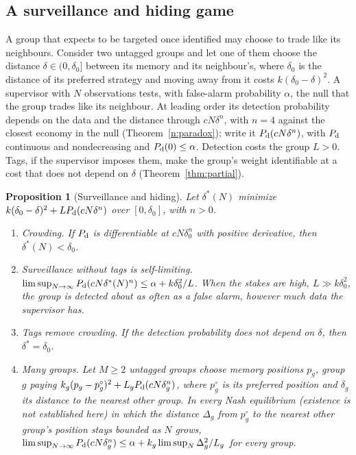 \documentclass[12pt]{article}
\newtheorem{proposition}[theorem]{Proposition}
\theoremstyle{definition}
\theoremstyle{remark}
\begin{document}
\subsection{A surveillance and hiding game}

A group that expects to be targeted once identified may choose to trade like its neighbours. Consider two untagged groups and let one of them choose the distance $\delta\in(0,\delta_0]$ between its memory and its neighbour's, where $\delta_0$ is the distance of its preferred strategy and moving away from it costs $k(\delta_0-\delta)^2$. A supervisor with $N$ observations tests, with false-alarm probability $\alpha$, the null that the group trades like its neighbour. At leading order its detection probability depends on the data and the distance through $cN\delta^n$, with $n=4$ against the closest economy in the null (Theorem~\ref{n:paradox}); write it $P_{\rm d}(cN\delta^n)$, with $P_{\rm d}$ continuous and nondecreasing and $P_{\rm d}(0)\le\alpha$. Detection costs the group $L>0$. Tags, if the supervisor imposes them, make the group's weight identifiable at a cost that does not depend on $\delta$ (Theorem~\ref{thm:partial}).

\begin{proposition}[Surveillance and hiding]\label{prop:hidegame}
Let $\delta^*(N)$ minimize $k(\delta_0-\delta)^2+LP_{\rm d}(cN\delta^n)$ over $[0,\delta_0]$, with $n>0$.
\begin{enumerate}[label=(\roman*),itemsep=1pt]
\item \emph{Crowding.} If $P_{\rm d}$ is differentiable at $cN\delta_0^n$ with positive derivative, then $\delta^*(N)<\delta_0$.
\item \emph{Surveillance without tags is self-limiting.} $\limsup_{N\to\infty}P_{\rm d}(cN\delta^*(N)^n)\le\alpha+k\delta_0^2/L$. When the stakes are high, $L\gg k\delta_0^2$, the group is detected about as often as a false alarm, however much data the supervisor has.
\item \emph{Tags remove crowding.} If the detection probability does not depend on $\delta$, then $\delta^*=\delta_0$.
\item \emph{Many groups.} Let $M\ge2$ untagged groups choose memory positions $p_g$, group $g$ paying $k_g(p_g-p^\circ_g)^2+L_gP_{\rm d}(cN\delta_g^n)$, where $p^\circ_g$ is its preferred position and $\delta_g$ its distance to the nearest other group. In every Nash equilibrium (existence is not established here) in which the distance $\Delta_g$ from $p^\circ_g$ to the nearest other group's position stays bounded as $N$ grows, $\limsup_{N\to\infty}P_{\rm d}(cN\delta_g^n)\le\alpha+k_g\limsup_N\Delta_g^2/L_g$ for every group.
\end{enumerate}
\end{proposition}
\end{document}
